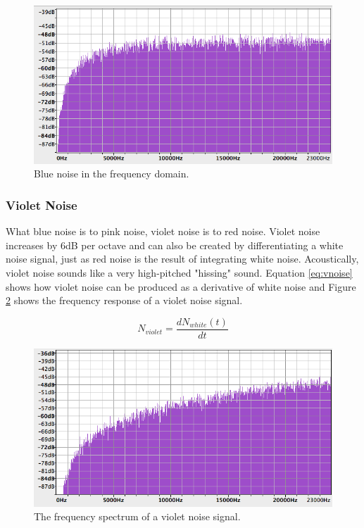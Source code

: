   \begin{figure}[hb!]
    \includegraphics[scale=0.6]{img/bnoisef}
    \caption{Blue noise in the frequency domain.}
    \label{fig:bnoisef}
  \end{figure}

  \pagebreak

  \subsubsection{Violet Noise}

  What blue noise is to pink noise, violet noise is to red noise. Violet noise increases by 6dB per octave and can also be created by differentiating a white noise signal, just as red noise is the result of integrating white noise. Acoustically, violet noise sounds like a very high-pitched "hissing" sound. Equation \ref{eq:vnoise} shows how violet noise can be produced as a derivative of white noise and Figure \ref{fig:vnoisef} shows the frequency response of a violet noise signal.

  \begin{equation}
    N_{violet} = \frac{dN_{white}(t)}{dt}
    \label{eq:vnoise}
  \end{equation}

  \begin{figure}
    \includegraphics[scale=0.6]{img/vnoisef}
    \caption{The frequency spectrum of a violet noise signal.}
    \label{fig:vnoisef}
  \end{figure}
